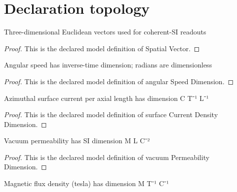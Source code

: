 \section{Declaration topology}
\begin{definition}
  \label{def:physics:phyx-mini-0967:phyxminiproblems-problemphyxmini0967-spatialvector}
  Three-dimensional Euclidean vectors used for coherent-SI readouts
\end{definition}
\begin{proof}
  This is the declared model definition of Spatial Vector.
\end{proof}
\begin{definition}
  \label{def:physics:phyx-mini-0967:phyxminiproblems-problemphyxmini0967-angularspeeddimension}
  Angular speed has inverse-time dimension; radians are dimensionless
\end{definition}
\begin{proof}
  This is the declared model definition of angular Speed Dimension.
\end{proof}
\begin{definition}
  \label{def:physics:phyx-mini-0967:phyxminiproblems-problemphyxmini0967-surfacecurrentdensitydimension}
  Azimuthal surface current per axial length has dimension C T⁻¹ L⁻¹
\end{definition}
\begin{proof}
  This is the declared model definition of surface Current Density Dimension.
\end{proof}
\begin{definition}
  \label{def:physics:phyx-mini-0967:phyxminiproblems-problemphyxmini0967-vacuumpermeabilitydimension}
  Vacuum permeability has SI dimension M L C⁻²
\end{definition}
\begin{proof}
  This is the declared model definition of vacuum Permeability Dimension.
\end{proof}
\begin{definition}
  \label{def:physics:phyx-mini-0967:phyxminiproblems-problemphyxmini0967-magneticfluxdensitydimension}
  Magnetic flux density (tesla) has dimension M T⁻¹ C⁻¹
\end{definition}
